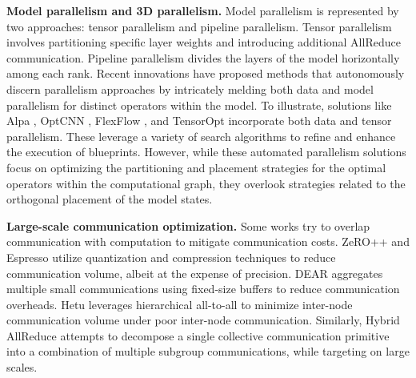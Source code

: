 \noindent\textbf{Model parallelism and 3D parallelism.} Model parallelism is represented by two approaches: tensor parallelism and pipeline parallelism. Tensor parallelism~\cite{Megatron-LM} involves partitioning specific layer weights and introducing additional AllReduce communication. Pipeline parallelism\cite{GPipe,DAPPLE,PipeDream,PipeMare} divides the layers of the model horizontally among each rank. Recent innovations have proposed methods that autonomously discern parallelism approaches by intricately melding both data and model parallelism for distinct operators within the model. To illustrate, solutions like Alpa \cite{Alpa}, OptCNN \cite{OptCNN}, FlexFlow \cite{FlexFlow,Unity}, and TensorOpt \cite{TensorOpt} incorporate both data and tensor parallelism. These leverage a variety of search algorithms to refine and enhance the execution of blueprints. However, while these automated parallelism solutions focus on optimizing the partitioning and placement strategies for the optimal operators within the computational graph, they overlook strategies related to the orthogonal placement of the model states.

\noindent\textbf{Large-scale communication optimization.} 
Some works\cite{ByteScheduler, P3, PyTorchFSDP} try to overlap communication with computation to mitigate communication costs. 
ZeRO++ and Espresso\cite{Hi-SpeedDNNTrainingwithEspresso} utilize quantization and compression techniques to reduce communication volume, albeit at the expense of precision. 
DEAR\cite{DeAR} aggregates multiple small communications using fixed-size buffers to reduce communication overheads. Hetu\cite{HetuMoE} leverages hierarchical all-to-all to minimize inter-node communication volume under poor inter-node communication. 
Similarly, Hybrid AllReduce\cite{HighlyScalable} attempts to decompose a single collective communication primitive into a combination of multiple subgroup communications, while targeting on large scales. 
